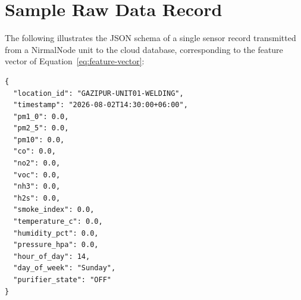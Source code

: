 \chapter{Sample Raw Data Record}
\label{app:sample-data}

The following illustrates the JSON schema of a single sensor record transmitted from a NirmalNode unit to the cloud database, corresponding to the feature vector of Equation~\ref{eq:feature-vector}:

\begin{verbatim}
{
  "location_id": "GAZIPUR-UNIT01-WELDING",
  "timestamp": "2026-08-02T14:30:00+06:00",
  "pm1_0": 0.0,
  "pm2_5": 0.0,
  "pm10": 0.0,
  "co": 0.0,
  "no2": 0.0,
  "voc": 0.0,
  "nh3": 0.0,
  "h2s": 0.0,
  "smoke_index": 0.0,
  "temperature_c": 0.0,
  "humidity_pct": 0.0,
  "pressure_hpa": 0.0,
  "hour_of_day": 14,
  "day_of_week": "Sunday",
  "purifier_state": "OFF"
}
\end{verbatim}

